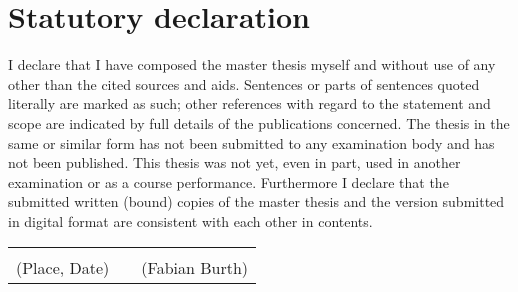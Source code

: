 

\setcounter{page}{2}

\chapter*{Statutory declaration}
I declare that I have composed the master thesis myself and without use of any other than the cited sources and aids. Sentences or parts of sentences quoted literally are marked as such; other references with regard to the statement and scope are indicated by full details of the publications concerned. The thesis in the same or similar form has not been submitted to any examination body and has not been published. This thesis was not yet, even in part, used in another examination or as a course performance. Furthermore I declare that the submitted written (bound) copies of the master thesis and the version submitted in digital format are consistent with each other in contents.\\
\linebreak
\linebreak
\linebreak
\noindent
\begin{tabularx}{\linewidth}{Xp{1mm}X}
	\makebox[\linewidth]{\hrulefill} &  & \makebox[\linewidth]{\hrulefill}\\
	\small(Place, Date) & & \small(Fabian Burth)
\end{tabularx}

\vspace{10mm}

\vfill